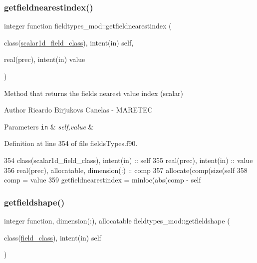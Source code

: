 \subsubsection{\texorpdfstring{getfieldnearestindex()}{getfieldnearestindex()}}
{\footnotesize\ttfamily integer function fieldtypes\+\_\+mod\+::getfieldnearestindex (\begin{DoxyParamCaption}\item[{class(\mbox{\hyperlink{structfieldtypes__mod_1_1scalar1d__field__class}{scalar1d\+\_\+field\+\_\+class}}), intent(in)}]{self,  }\item[{real(prec), intent(in)}]{value }\end{DoxyParamCaption})\hspace{0.3cm}{\ttfamily [private]}}



Method that returns the field\textquotesingle{}s nearest value index (scalar) 

\begin{DoxyAuthor}{Author}
Ricardo Birjukovs Canelas -\/ M\+A\+R\+E\+T\+EC 
\end{DoxyAuthor}

\begin{DoxyParams}[1]{Parameters}
\mbox{\tt in}  & {\em self,value} & \\
\hline
\end{DoxyParams}


Definition at line 354 of file fields\+Types.\+f90.


\begin{DoxyCode}
354     \textcolor{keywordtype}{class}(scalar1d\_field\_class), \textcolor{keywordtype}{intent(in)} :: self
355     \textcolor{keywordtype}{real(prec)}, \textcolor{keywordtype}{intent(in)} :: value
356     \textcolor{keywordtype}{real(prec)}, \textcolor{keywordtype}{allocatable}, \textcolor{keywordtype}{dimension(:)} :: comp
357     \textcolor{keyword}{allocate}(comp(\textcolor{keyword}{size}(self%
358     comp = \textcolor{keywordtype}{value}
359     getfieldnearestindex = minloc(abs(comp - self%
\end{DoxyCode}
\mbox{\label{namespacefieldtypes__mod_ab8a0fa52771fc81b6f8a39cbb9ad2c34}} 
\subsubsection{\texorpdfstring{getfieldshape()}{getfieldshape()}}
{\footnotesize\ttfamily integer function, dimension(\+:), allocatable fieldtypes\+\_\+mod\+::getfieldshape (\begin{DoxyParamCaption}\item[{class(\mbox{\hyperlink{structfieldtypes__mod_1_1field__class}{field\+\_\+class}}), intent(in)}]{self }\end{DoxyParamCaption})\hspace{0.3cm}{\ttfamily [private]}}



